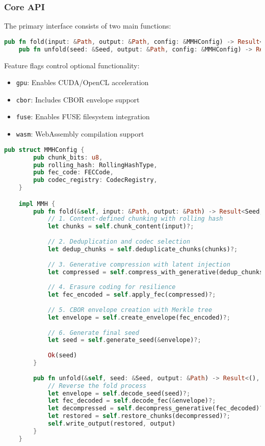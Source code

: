 \documentclass[11pt,a4paper]{article}
\begin{document}
	\subsubsection{Core API}
	
	The primary interface consists of two main functions:
	\begin{lstlisting}[language=rust,caption={Core API Signature}]
	pub fn fold(input: &Path, output: &Path, config: &MMHConfig) -> Result<Seed, MMHError>
	pub fn unfold(seed: &Seed, output: &Path, config: &MMHConfig) -> Result<(), MMHError>
	\end{lstlisting}
	
	Feature flags control optional functionality:
	\begin{itemize}
		\item \texttt{gpu}: Enables CUDA/OpenCL acceleration
		\item \texttt{cbor}: Includes CBOR envelope support
		\item \texttt{fuse}: Enables FUSE filesystem integration
		\item \texttt{wasm}: WebAssembly compilation support
	\end{itemize}
	
	\begin{lstlisting}[language=rust,caption={MMH Core Algorithm},label=lst:mmh-algorithm]
	pub struct MMHConfig {
		pub chunk_bits: u8,
		pub rolling_hash: RollingHashType,
		pub fec_code: FECCode,
		pub codec_registry: CodecRegistry,
	}

	impl MMH {
		pub fn fold(&self, input: &Path, output: &Path) -> Result<Seed, MMHError> {
			// 1. Content-defined chunking with rolling hash
			let chunks = self.chunk_content(input)?;
			
			// 2. Deduplication and codec selection
			let dedup_chunks = self.deduplicate_chunks(chunks)?;
			
			// 3. Generative compression with latent injection
			let compressed = self.compress_with_generative(dedup_chunks)?;
			
			// 4. Erasure coding for resilience
			let fec_encoded = self.apply_fec(compressed)?;
			
			// 5. CBOR envelope creation with Merkle tree
			let envelope = self.create_envelope(fec_encoded)?;
			
			// 6. Generate final seed
			let seed = self.generate_seed(&envelope)?;
			
			Ok(seed)
		}
		
		pub fn unfold(&self, seed: &Seed, output: &Path) -> Result<(), MMHError> {
			// Reverse the fold process
			let envelope = self.decode_seed(seed)?;
			let fec_decoded = self.decode_fec(&envelope)?;
			let decompressed = self.decompress_generative(fec_decoded)?;
			let restored = self.restore_chunks(decompressed)?;
			self.write_output(restored, output)
		}
	}
	\end{lstlisting}
	
\end{document}
